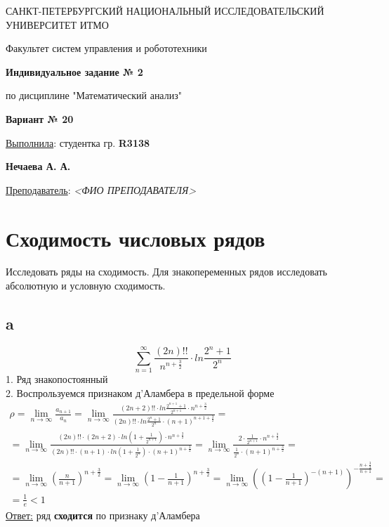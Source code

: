 \documentclass[a5paper, 10pt]{article}
\theoremstyle{definition}
\theoremstyle{plain}
\theoremstyle{remark}
\newcommand*{\titlePage}{
	\thispagestyle{title}
	\begingroup
	\begin{center}
		\vspace*{6ex}
		
		{\small
			САНКТ-ПЕТЕРБУРГСКИЙ НАЦИОНАЛЬНЫЙ ИССЛЕДОВАТЕЛЬСКИЙ УНИВЕРСИТЕТ ИТМО
		}
		
		\vspace*{2ex}
		
		{\normalsize
			Факультет систем управления и робототехники
		}
		
		\vspace*{15ex}
		
		{\Large \bfseries 
			Индивидуальное задание № 2
		}

\vspace*{2ex}
		
		{\normalsize
			по дисциплине "Математический анализ"
		}
\vspace*{5ex}
		
		{\Large \bfseries 
			 Вариант № 20
		}
	\end{center}
	\vspace*{20ex}
	\begin{flushright}
		{\large 
			\underline{Выполнила}: студентка гр. \textbf{R3138}\\
			\begin{flushright}
				\textbf{Нечаева А. А.}\\
			\end{flushright}
		}
		
		\vspace*{5ex}
		
		{\large 
			\underline{Преподаватель}: \textit{<ФИО ПРЕПОДАВАТЕЛЯ>}
		}
	\end{flushright}	
	\newpage
	\setcounter{page}{2}
	\endgroup}
\begin{document}
	\titlePage
	\pagestyle{style}
\newpage
\section{ Сходимость числовых рядов}
Исследовать ряды на сходимость. Для знакопеременных рядов исследовать абсолютную и условную сходимость.	

\subsection{a}
\begin{equation}
\sum \limits_{n = 1}^{\infty} \frac{\left(2n\right)!!}{n^{n+\frac{3}{2}}} \cdot ln \frac{2^n+1}{2^n}
\end{equation}
1. Ряд знакопостоянный\\
2. Воспрользуемся признаком д'Аламбера в предельной форме
\begin{multline*}
\rho = \lim_{n \to \infty} \frac{a_{n+1}}{a_n} = \lim_{n \to \infty} \frac{\left(2n+2\right)!! \cdot ln\frac{2^{n+1}+1}{2^{n+1}}\cdot n^{n+\frac{3}{2}}}{\left(2n\right)!! \cdot ln\frac{2^{n}+1}{2^{n}}\cdot (n+1)^{n + 1+\frac{3}{2}}} =\\
=  \lim_{n \to \infty} \frac{\left(2n\right)!!\cdot \left(2n+2\right) \cdot ln\left(1 + \frac{1}{2^{n+1}}\right)\cdot n^{n+\frac{3}{2}}}{\left(2n\right)!! \cdot (n+1)\cdot ln\left(1 + \frac{1}{2^{n}}\right)\cdot (n+1)^{n + \frac{3}{2}}} =
 \lim_{n \to \infty} \frac{ 2\cdot  \frac{1}{2^{n+1}}\cdot n^{n+\frac{3}{2}}}{ \frac{1}{2^{n}}\cdot (n+1)^{n + \frac{3}{2}}}=\\ =\lim_{n \to \infty} \left(\frac{n}{n+1} \right)^{n+\frac{3}{2}}= \lim_{n \to \infty} \left(1 - \frac{1}{n+1} \right)^{n+\frac{3}{2}}=\lim_{n \to \infty}  \left( \left(1 - \frac{1}{n+1} \right)^{-(n+1) } \right)^{-\frac{n+\frac{3}{2}}{n+1} }=\\
= \frac{1}{e} < 1
\end{multline*}
\underline{Ответ:} ряд  \textbf{сходится}  по признаку  д'Аламбера


\newpage
\end{document}
